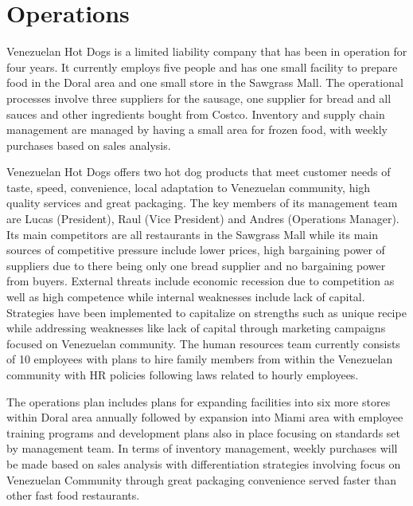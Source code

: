 

\section{Operations}\label{sec:operations}
 Venezuelan Hot Dogs is a limited liability company that has been in operation for four years. It currently employs five people and has one small facility to prepare food in the Doral area and one small store in the Sawgrass Mall. The operational processes involve three suppliers for the sausage, one supplier for bread and all sauces and other ingredients bought from Costco. Inventory and supply chain management are managed by having a small area for frozen food, with weekly purchases based on sales analysis. 

Venezuelan Hot Dogs offers two hot dog products that meet customer needs of taste, speed, convenience, local adaptation to Venezuelan community, high quality services and great packaging. The key members of its management team are Lucas (President), Raul (Vice President) and Andres (Operations Manager). Its main competitors are all restaurants in the Sawgrass Mall while its main sources of competitive pressure include lower prices, high bargaining power of suppliers due to there being only one bread supplier and no bargaining power from buyers. External threats include economic recession due to competition as well as high competence while internal weaknesses include lack of capital. Strategies have been implemented to capitalize on strengths such as unique recipe while addressing weaknesses like lack of capital through marketing campaigns focused on Venezuelan community. The human resources team currently consists of 10 employees with plans to hire family members from within the Venezuelan community with HR policies following laws related to hourly employees. 

The operations plan includes plans for expanding facilities into six more stores within Doral area annually followed by expansion into Miami area with employee training programs and development plans also in place focusing on standards set by management team. In terms of inventory management, weekly purchases will be made based on sales analysis with differentiation strategies involving focus on Venezuelan Community through great packaging convenience served faster than other fast food restaurants. 

